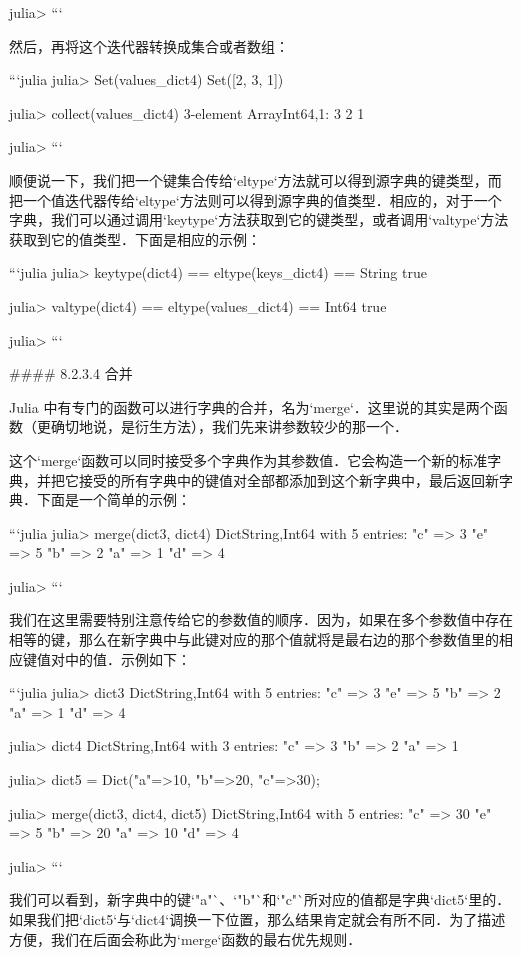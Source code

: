 julia> 
```

然后，再将这个迭代器转换成集合或者数组：

```julia
julia> Set(values_dict4)
Set([2, 3, 1])

julia> collect(values_dict4)
3-element Array{Int64,1}:
 3
 2
 1

julia>
```

顺便说一下，我们把一个键集合传给`eltype`方法就可以得到源字典的键类型，而把一个值迭代器传给`eltype`方法则可以得到源字典的值类型．相应的，对于一个字典，我们可以通过调用`keytype`方法获取到它的键类型，或者调用`valtype`方法获取到它的值类型．下面是相应的示例：

```julia 
julia> keytype(dict4) == eltype(keys_dict4) == String
true

julia> valtype(dict4) == eltype(values_dict4) == Int64
true

julia> 
```

#### 8.2.3.4 合并

Julia 中有专门的函数可以进行字典的合并，名为`merge`．这里说的其实是两个函数（更确切地说，是衍生方法），我们先来讲参数较少的那一个．

这个`merge`函数可以同时接受多个字典作为其参数值．它会构造一个新的标准字典，并把它接受的所有字典中的键值对全部都添加到这个新字典中，最后返回新字典．下面是一个简单的示例：

```julia
julia> merge(dict3, dict4)
Dict{String,Int64} with 5 entries:
  "c" => 3
  "e" => 5
  "b" => 2
  "a" => 1
  "d" => 4

julia> 
```

我们在这里需要特别注意传给它的参数值的顺序．因为，如果在多个参数值中存在相等的键，那么在新字典中与此键对应的那个值就将是最右边的那个参数值里的相应键值对中的值．示例如下：

```julia
julia> dict3
Dict{String,Int64} with 5 entries:
  "c" => 3
  "e" => 5
  "b" => 2
  "a" => 1
  "d" => 4

julia> dict4
Dict{String,Int64} with 3 entries:
  "c" => 3
  "b" => 2
  "a" => 1

julia> dict5 = Dict("a"=>10, "b"=>20, "c"=>30);

julia> merge(dict3, dict4, dict5)
Dict{String,Int64} with 5 entries:
  "c" => 30
  "e" => 5
  "b" => 20
  "a" => 10
  "d" => 4

julia> 
```

我们可以看到，新字典中的键`"a"`、`"b"`和`"c"`所对应的值都是字典`dict5`里的．如果我们把`dict5`与`dict4`调换一下位置，那么结果肯定就会有所不同．为了描述方便，我们在后面会称此为`merge`函数的最右优先规则．

